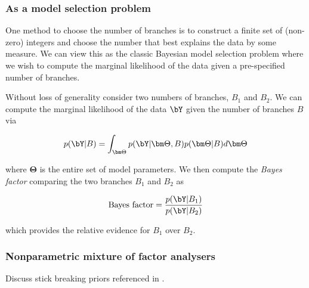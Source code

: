 \subsubsection{As a model selection problem}

One method to choose the number of branches is to construct a finite set of (non-zero) integers and choose the number that best explains the data by some measure. We can view this as the classic Bayesian model selection problem where we wish to compute the marginal likelihood of the data given a pre-specified number of branches.

Without loss of generality consider two numbers of branches, $B_1$ and $B_2$. We can compute the marginal likelihood of the data $\bY$ given the number of branches $B$ via

\begin{equation}
	p(\bY | B) = \int_{\bm \Theta} p(\bY | \bm \Theta, B) p (\bm \Theta | B) d \bm\Theta
\end{equation}

where $\bm \Theta$ is the entire set of model parameters. We then compute the \emph{Bayes factor} comparing the two branches $B_1$ and $B_2$ as

\begin{equation}
	\text{Bayes factor} = \frac{p(\bY | B_1)}{p(\bY | B_2)}
\end{equation}

which provides the relative evidence for $B_1$ over $B_2$.

\subsubsection{Nonparametric mixture of factor analysers}

Discuss stick breaking priors referenced in \cite{lonnberg2016temporal}.
